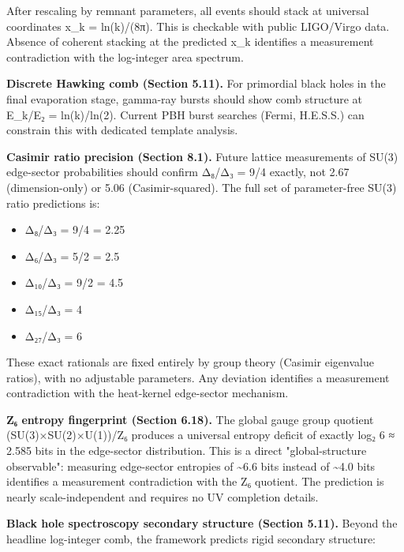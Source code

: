 After rescaling by remnant parameters, all events should stack at universal coordinates x\_k = ln(k)/(8π). This is checkable with public LIGO/Virgo data. Absence of coherent stacking at the predicted x\_k identifies a measurement contradiction with the log-integer area spectrum.

\textbf{Discrete Hawking comb (Section 5.11).} For primordial black holes in the final evaporation stage, gamma-ray bursts should show comb structure at E\_k/E₂ = ln(k)/ln(2). Current PBH burst searches (Fermi, H.E.S.S.) can constrain this with dedicated template analysis.

\textbf{Casimir ratio precision (Section 8.1).} Future lattice measurements of SU(3) edge-sector probabilities should confirm Δ₈/Δ₃ = 9/4 exactly, not 2.67 (dimension-only) or 5.06 (Casimir-squared). The full set of parameter-free SU(3) ratio predictions is:

\begin{itemize}
\tightlist
\item
  Δ₈/Δ₃ = 9/4 = 2.25
\item
  Δ₆/Δ₃ = 5/2 = 2.5
\item
  Δ₁₀/Δ₃ = 9/2 = 4.5
\item
  Δ₁₅/Δ₃ = 4
\item
  Δ₂₇/Δ₃ = 6
\end{itemize}

These exact rationals are fixed entirely by group theory (Casimir eigenvalue ratios), with no adjustable parameters. Any deviation identifies a measurement contradiction with the heat-kernel edge-sector mechanism.

\textbf{Z₆ entropy fingerprint (Section 6.18).} The global gauge group quotient (SU(3)×SU(2)×U(1))/Z₆ produces a universal entropy deficit of exactly log₂ 6 ≈ 2.585 bits in the edge-sector distribution. This is a direct "global-structure observable": measuring edge-sector entropies of \textasciitilde6.6 bits instead of \textasciitilde4.0 bits identifies a measurement contradiction with the Z₆ quotient. The prediction is nearly scale-independent and requires no UV completion details.

\textbf{Black hole spectroscopy secondary structure (Section 5.11).} Beyond the headline log-integer comb, the framework predicts rigid secondary structure:

